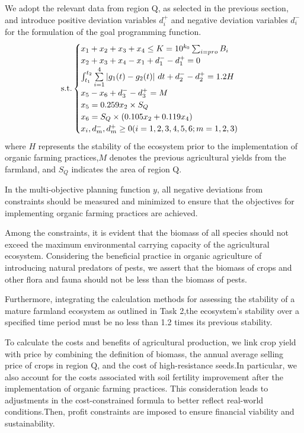 \documentclass[12pt]{article}
\begin{document}
	We adopt the relevant data from region Q, as selected in the previous section, and introduce positive deviation variables $d_i^+$ and negative deviation variables $d_i^-$ for the formulation of the goal programming function.
	\begin{equation}
		\text{s.t.} \\
		\begin{cases}
			x_1 + x_2 + x_3 + x_4 \leq K = 10^{k_0} \sum_{i=pro}B_i\\
			x_2 + x_3 + x_4 - x_1 + d_1^- - d_1^+ = 0 \\
			\int_{t_1}^{t_2} \sum\limits_{i=1}^{4} \left| g_1(t) - g_2(t) \right| \, dt + d_2^- - d_2^+ = 1.2H \\
			x_5 - x_6 + d_3^- - d_3^+ = M\\
			x_5 = 0.259x_2\times S_{Q} \\
			x_6 =S_{Q}\times (0.105x_2+ 0.119x_4)\\
			x_i,d_m^-,d_m^+\geq 0  (i=1,2,3,4,5,6;m=1,2,3)
		\end{cases}  
	\end{equation}
	where $H$ represents the stability of the ecosystem prior to the implementation of organic farming practices,$M$ denotes the previous agricultural yields from the farmland, and $S_{Q}$ indicates the area of region Q.
	
	In the multi-objective planning function $y$, all negative deviations from constraints should be measured and minimized to ensure that the objectives for implementing organic farming practices are achieved.
	
	Among the constraints, it is evident that the biomass of all species should not exceed the maximum environmental carrying capacity of the agricultural ecosystem. Considering the beneficial practice in organic agriculture of introducing natural predators of pests, we assert that the biomass of crops and other flora and fauna should not be less than the biomass of pests.
	
	Furthermore, integrating the calculation methods for assessing the stability of a mature farmland ecosystem as outlined in Task 2,the ecosystem's stability over a specified time period must be no less than 1.2 times its previous stability. 
	
	To calculate the costs and benefits of agricultural production, we link crop yield with price by combining the definition of biomass, the annual average selling price of crops in region Q, and the cost of high-resistance seeds.In particular, we also account for the costs associated with soil fertility improvement after the implementation of organic farming practices. This consideration leads to adjustments in the cost-constrained formula to better reflect real-world conditions.Then, profit constraints are imposed to ensure financial viability and sustainability.
	
\end{document}
